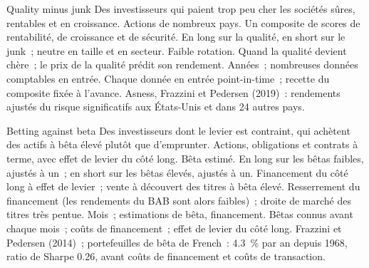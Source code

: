\begin{strategyfile}{Quality minus junk}\label{strat:s1:value-quality-and-low-risk:qmj}
 Des investisseurs qui paient trop peu cher les sociétés sûres, rentables et en croissance.
 Actions de nombreux pays.
 Un composite de scores de rentabilité, de croissance et de sécurité.
 En long sur la qualité, en short sur le junk~; neutre en taille et en secteur.
 Faible rotation.
 Quand la qualité devient chère~; le prix de la qualité prédit son rendement.
 Années~; nombreuses données comptables en entrée.
 Chaque donnée en entrée point-in-time~; recette du composite fixée à l'avance.
 Asness, Frazzini et Pedersen (2019)~: rendements ajustés du risque significatifs aux États-Unis et dans 24 autres pays.
\end{strategyfile}

\begin{strategyfile}{Betting against beta}\label{strat:s1:value-quality-and-low-risk:bab}
 Des investisseurs dont le levier est contraint, qui achètent des actifs à bêta élevé plutôt que d'emprunter.
 Actions, obligations et contrats à terme, avec effet de levier du côté long.
 Bêta estimé.
 En long sur les bêtas faibles, ajustés à un~; en short sur les bêtas élevés, ajustés à un.
 Financement du côté long à effet de levier~; vente à découvert des titres à bêta élevé.
 Resserrement du financement (les rendements du BAB sont alors faibles)~; droite de marché des titres très pentue.
 Mois~; estimations de bêta, financement.
 Bêtas connus avant chaque mois~; coûts de financement~; effet de levier du côté long.
 Frazzini et Pedersen (2014)~; portefeuilles de bêta de French~: 4.3~\% par an depuis 1968, ratio de Sharpe 0.26, avant coûts de financement et coûts de transaction.
\end{strategyfile}

